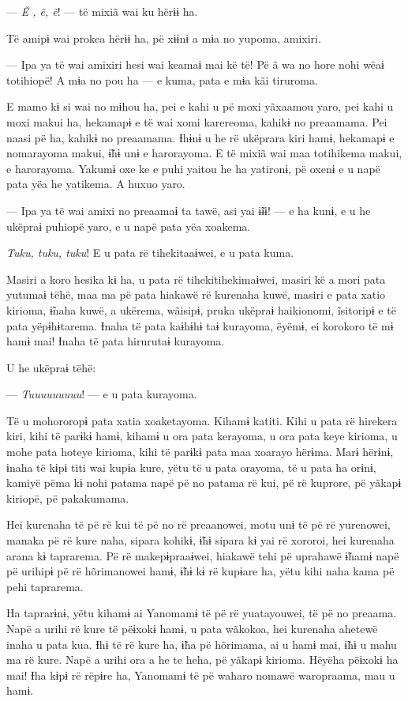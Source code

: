 --- \textit{Ẽ , ẽ, ẽ}! --- të mixiã wai ku hërɨɨ ha. 

Të amipɨ wai prokea hërɨɨ ha, pë xɨɨnɨ a mɨa no yupoma, amixiri. 

--- Ipa ya të wai amixiri hesi wai keamaɨ mai kë të! Pë ã wa no hore nohi
wëaɨ totihiopë! A mɨa no pou ha --- e kuma, pata e mɨa kãi tiruroma. 

E mamo kɨ si wai no mɨhou ha, pei e kahi u pë moxi yãxaamou yaro, pei
 kahi u moxi makui ha, hekamapɨ e të wai xomi karereoma, kahikɨ no
 preaamama. Pei naasi pë ha, kahikɨ no preaamama. Ɨhɨnɨ u he rë ukëprara
 kiri hamɨ, hekamapɨ e nomarayoma makui, ɨ̃hɨ unɨ e harorayoma. E të mixiã
 wai maa totihikema makui, e harorayoma. Yakumɨ oxe ke e puhi yaitou he
 ha yatironɨ, pë oxenɨ e u napë pata yëa he yatikema. A huxuo yaro. 

--- Ipa ya të wai amixi no preaamaɨ ta tawë, asi yai ɨ̃ɨɨ! --- e ha kunɨ, e
u he ukëpraɨ puhiopë yaro, e u napë pata yëa xoakema. 

\textit{Tuku, tuku, tuku}! E u pata rë tihekitaaɨwei, e u pata kuma. 

Masiri a koro hesika kɨ ha, u pata rë tihekitihekimaɨwei, masiri kë a
mori pata yutumaɨ tëhë, maa ma pë pata hiakawë rë kurenaha kuwë, masiri
e pata xatio kirioma, ɨ̃naha kuwë, a ukërema, wãisipɨ, pruka ukëpraɨ
haikionomi, ĩsitoripɨ e të pata yëpɨhɨtarema. Ɨnaha të pata kaɨhɨhɨ taɨ
kurayoma, ëyëmɨ, ei korokoro të mɨ hamɨ mai! Ɨnaha të pata hirurutaɨ
kurayoma. 

U he ukëpraɨ tëhë: 

--- \textit{Tuuuuuuuuu}! --- e u pata kurayoma. 

Të u mohororopɨ pata xatia xoaketayoma. Kihamɨ katiti. Kihi u pata rë
hirekera kiri, kihi të parɨkɨ hamɨ, kihamɨ u ora pata kerayoma, u ora
pata keye kirioma, u mohe pata hoteye kirioma, kihi të parɨkɨ pata maa
xoarayo hërɨma. Marɨ hërɨnɨ, ɨnaha të kɨpɨ titi wai kupɨa kure, yëtu të
u pata orayoma, të u pata ha orɨnɨ, kamiyë pëma kɨ nohi patama napë pë
no patama rë kui, pë rë kuprore, pë yãkapɨ kiriopë, pë pakakumama. 

Hei kurenaha të pë rë kui të pë no rë preaanowei, motu unɨ të pë rë
 yurenowei, manaka pë rë kure naha, sipara kohikɨ, ɨ̃hɨ sipara kɨ yai rë
 xororoi, hei kurenaha arana kɨ taprarema. Pë rë makepɨpraaɨwei, hiakawë
 tehi pë uprahawë ɨ̃hamɨ napë pë urihipɨ pë rë hõrimanowei hamɨ, ɨ̃hɨ kɨ rë
 kupɨare ha, yëtu kihi naha kama pë pehi taprarema. 

Ha taprarɨnɨ, yëtu kihamɨ ai Yanomamɨ të pë rë yuatayouwei, të pë no
preaama. Napë a urihi rë kure të pëɨxokɨ hamɨ, u pata wãkokoa, hei
kurenaha ahetewë inaha u pata kua. Ɨhɨ të rë kure ha, ɨ̃ha pë hõrimama,
ai u hamɨ mai, ɨ̃hɨ u mahu ma rë kure. Napë a urihi ora a he te heha, pë
yãkapɨ kirioma. Hëyëha pëɨxokɨ ha mai! Ɨha kɨpɨ rë rëpɨre ha, Yanomamɨ
të pë waharo nomawë waropraama, mau u hamɨ. 

